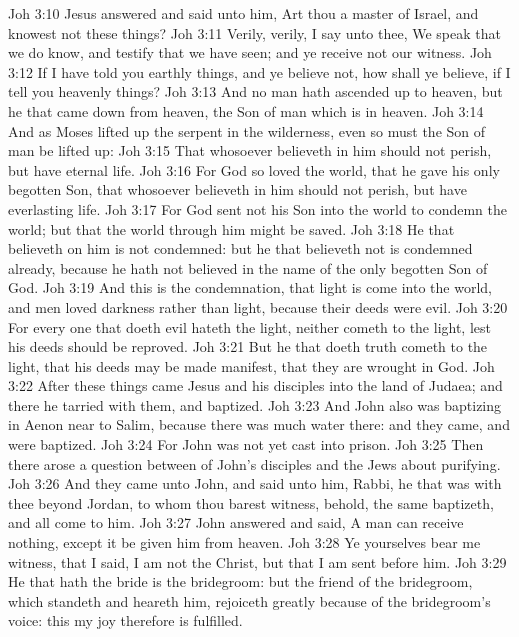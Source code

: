 \vs Joh 3:10 Jesus answered and said unto him, Art thou a master of Israel, and knowest not these things?
\vs Joh 3:11 Verily, verily, I say unto thee, We speak that we do know, and testify that we have seen; and ye receive not our witness.
\vs Joh 3:12 If I have told you earthly things, and ye believe not, how shall ye believe, if I tell you  heavenly things?
\vs Joh 3:13 And no man hath ascended up to heaven, but he that came down from heaven,  the Son of man which is in heaven.
\vs Joh 3:14 And as Moses lifted up the serpent in the wilderness, even so must the Son of man be lifted up:
\vs Joh 3:15 That whosoever believeth in him should not perish, but have eternal life.
\vs Joh 3:16 For God so loved the world, that he gave his only begotten Son, that whosoever believeth in him should not perish, but have everlasting life.
\vs Joh 3:17 For God sent not his Son into the world to condemn the world; but that the world through him might be saved.
\vs Joh 3:18 He that believeth on him is not condemned: but he that believeth not is condemned already, because he hath not believed in the name of the only begotten Son of God.
\vs Joh 3:19 And this is the condemnation, that light is come into the world, and men loved darkness rather than light, because their deeds were evil.
\vs Joh 3:20 For every one that doeth evil hateth the light, neither cometh to the light, lest his deeds should be reproved.
\vs Joh 3:21 But he that doeth truth cometh to the light, that his deeds may be made manifest, that they are wrought in God.
\vs Joh 3:22 After these things came Jesus and his disciples into the land of Judaea; and there he tarried with them, and baptized.
\vs Joh 3:23 And John also was baptizing in Aenon near to Salim, because there was much water there: and they came, and were baptized.
\vs Joh 3:24 For John was not yet cast into prison.
\vs Joh 3:25 Then there arose a question between  of John's disciples and the Jews about purifying.
\vs Joh 3:26 And they came unto John, and said unto him, Rabbi, he that was with thee beyond Jordan, to whom thou barest witness, behold, the same baptizeth, and all  come to him.
\vs Joh 3:27 John answered and said, A man can receive nothing, except it be given him from heaven.
\vs Joh 3:28 Ye yourselves bear me witness, that I said, I am not the Christ, but that I am sent before him.
\vs Joh 3:29 He that hath the bride is the bridegroom: but the friend of the bridegroom, which standeth and heareth him, rejoiceth greatly because of the bridegroom's voice: this my joy therefore is fulfilled.
